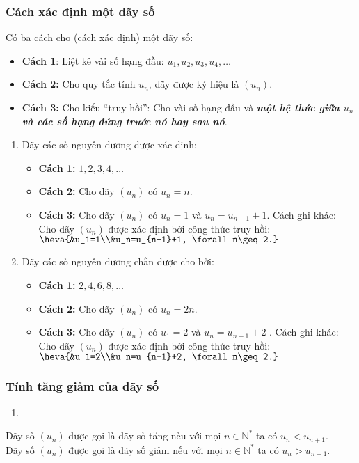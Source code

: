 \subsubsection{Cách xác định một dãy số}	
Có ba cách cho (cách xác định) một dãy số:
\begin{itemize}
\item \textbf{Cách 1}: Liệt kê vài số hạng đầu: $u_1, u_2, u_3, u_4,\ldots$
\item \textbf{Cách 2:} Cho quy tắc tính $u_n$, dãy được ký hiệu là $(u_n)$.
\item \textbf{Cách 3:} Cho kiểu “truy hồi”: Cho vài số hạng đầu và \textbf{\textit{một hệ thức giữa  $u_n$ và các số hạng đứng trước nó hay sau nó}}.
\end{itemize}
\begin{vd}\hfill 
\begin{enumerate}
\item Dãy các số nguyên dương được xác định:
\begin{itemize}
\item \textbf{Cách 1:} $1,2,3,4,\ldots$ 
\item \textbf{Cách 2:} Cho dãy $(u_n)$ có $u_n=n$.
\item \textbf{Cách 3:} Cho dãy $(u_n)$  có  $u_n=1$ và $u_n=u_{n-1}+1$. Cách ghi khác: Cho dãy $(u_n)$  được xác định bởi công thức truy hồi:$\heva{&u_1=1\\&u_n=u_{n-1}+1, \forall n\geq 2.}$ 
\end{itemize}
\item Dãy các số nguyên dương chẵn được cho bởi:
\begin{itemize}
\item \textbf{Cách 1:} $2,4,6,8,\ldots$
\item \textbf{Cách 2:} Cho dãy $(u_n)$  có $u_n=2n$.
\item \textbf{Cách 3:} Cho dãy $(u_n)$  có $u_1=2$  và $u_n=u_{n-1}+2$ . Cách ghi khác: Cho dãy $(u_n)$  được xác định bởi công thức truy hồi: $\heva{&u_1=2\\&u_n=u_{n-1}+2, \forall n\geq 2.}$
\end{itemize}
\end{enumerate}
\end{vd}
\subsubsection{Tính tăng giảm của dãy số}
\begin{dn}
	\begin{enumerate}
		\item[]
	\end{enumerate}
	\noindent Dãy số $(u_n)$ được gọi là dãy số tăng nếu với mọi $n\in \mathbb{N}^*$ ta có $u_n<u_{n+1}$.\\
	Dãy số $(u_n)$ được gọi là dãy số giảm nếu với mọi $n\in \mathbb{N}^*$ ta có $u_n>u_{n+1}$.
\end{dn}

